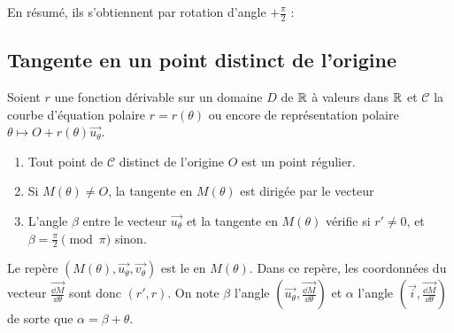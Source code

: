 \documentclass[class=report,crop=false]{standalone}
\begin{document}
En résumé, ils s'obtiennent par rotation d'angle $+\frac \pi2$  :

%
%


\subsection{Tangente en un point distinct de l'origine}

Soient $r$ une fonction dérivable sur un domaine $D$ de $\mathbb{R}$ à
valeurs dans $\mathbb{R}$ et $\mathcal{C}$ la courbe d'équation polaire
$r=r(\theta)$ ou encore de représentation polaire
$\theta\mapsto O+r(\theta)\overrightarrow{u_\theta}$.

\begin{theoreme}
\sauteligne
\begin{enumerate}
\item Tout point de $\mathcal{C}$ distinct de l'origine $O$ est un point régulier.

\item Si $M(\theta)\neq O$, la tangente en $M(\theta)$ est dirigée
par le vecteur

\item L'angle $\beta$ entre le vecteur $\overrightarrow{u_\theta}$ et la tangente
en $M(\theta)$ vérifie  si $r'\neq 0$,
et $\beta=\frac\pi2 \pmod \pi$ sinon.

\end{enumerate}
\end{theoreme}



Le repère $(M(\theta),\overrightarrow{u_\theta},\overrightarrow{v_\theta})$ est le 
en $M(\theta)$. Dans ce repère, les coordonnées du vecteur
$\overrightarrow{\frac{\dd M}{\dd\theta}}$ sont donc $(r',r)$.
On note $\beta$ l'angle $(\overrightarrow{u_\theta},\overrightarrow{\frac{\dd M}{\dd\theta}})$
et $\alpha$ l'angle $(\overrightarrow{i},\overrightarrow{\frac{\dd M}{\dd\theta}})$ de sorte
que $\alpha=\beta+\theta$.
\end{document}
